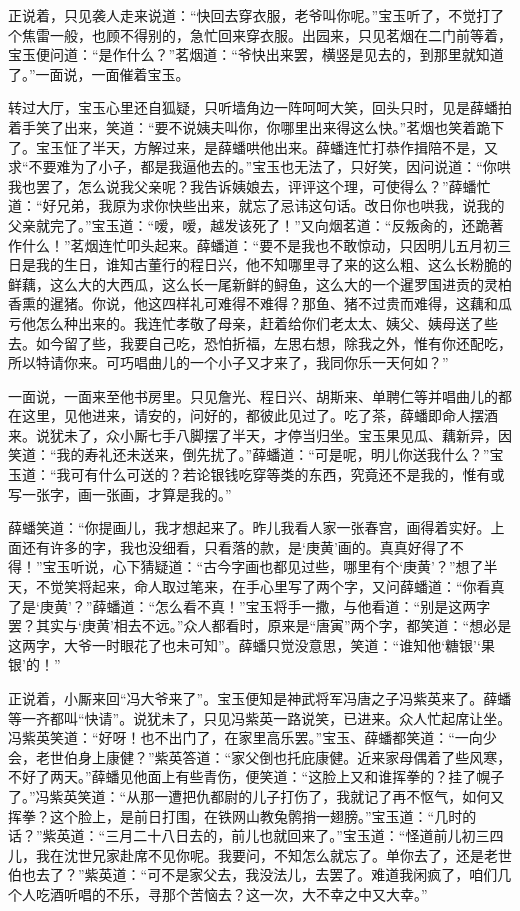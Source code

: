 \documentclass[12pt,oneside]{book}
\begin{document}
正说着，只见袭人走来说道：“快回去穿衣服，老爷叫你呢。”宝玉听了，不觉打了个焦雷一般，也顾不得别的，急忙回来穿衣服。出园来，只见茗烟在二门前等着，宝玉便问道：“是作什么？”茗烟道：“爷快出来罢，横竖是见去的，到那里就知道了。”一面说，一面催着宝玉。

转过大厅，宝玉心里还自狐疑，只听墙角边一阵呵呵大笑，回头只时，见是薛蟠拍着手笑了出来，笑道：“要不说姨夫叫你，你哪里出来得这么快。”茗烟也笑着跪下了。宝玉怔了半天，方解过来，是薛蟠哄他出来。薛蟠连忙打恭作揖陪不是，又求“不要难为了小子，都是我逼他去的。”宝玉也无法了，只好笑，因问说道：“你哄我也罢了，怎么说我父亲呢？我告诉姨娘去，评评这个理，可使得么？”薛蟠忙道：“好兄弟，我原为求你快些出来，就忘了忌讳这句话。改日你也哄我，说我的父亲就完了。”宝玉道：“嗳，嗳，越发该死了！”又向烟茗道：“反叛肏的，还跪著作什么！”茗烟连忙叩头起来。薛蟠道：“要不是我也不敢惊动，只因明儿五月初三日是我的生日，谁知古董行的程日兴，他不知哪里寻了来的这么粗、这么长粉脆的鲜藕，这么大的大西瓜，这么长一尾新鲜的鲟鱼，这么大的一个暹罗国进贡的灵柏香熏的暹猪。你说，他这四样礼可难得不难得？那鱼、猪不过贵而难得，这藕和瓜亏他怎么种出来的。我连忙孝敬了母亲，赶着给你们老太太、姨父、姨母送了些去。如今留了些，我要自己吃，恐怕折福，左思右想，除我之外，惟有你还配吃，所以特请你来。可巧唱曲儿的一个小子又才来了，我同你乐一天何如？”

一面说，一面来至他书房里。只见詹光、程日兴、胡斯来、单聘仁等并唱曲儿的都在这里，见他进来，请安的，问好的，都彼此见过了。吃了茶，薛蟠即命人摆酒来。说犹未了，众小厮七手八脚摆了半天，才停当归坐。宝玉果见瓜、藕新异，因笑道：“我的寿礼还未送来，倒先扰了。”薛蟠道：“可是呢，明儿你送我什么？”宝玉道：“我可有什么可送的？若论银钱吃穿等类的东西，究竟还不是我的，惟有或写一张字，画一张画，才算是我的。”

薛蟠笑道：“你提画儿，我才想起来了。昨儿我看人家一张春宫，画得着实好。上面还有许多的字，我也没细看，只看落的款，是‘庚黄’画的。真真好得了不得！”宝玉听说，心下猜疑道：“古今字画也都见过些，哪里有个‘庚黄’？”想了半天，不觉笑将起来，命人取过笔来，在手心里写了两个字，又问薛蟠道：“你看真了是‘庚黄’？”薛蟠道：“怎么看不真！”宝玉将手一撒，与他看道：“别是这两字罢？其实与‘庚黄’相去不远。”众人都看时，原来是“唐寅”两个字，都笑道：“想必是这两字，大爷一时眼花了也未可知”。薛蟠只觉没意思，笑道：“谁知他‘糖银’‘果银’的！”

正说着，小厮来回“冯大爷来了”。宝玉便知是神武将军冯唐之子冯紫英来了。薛蟠等一齐都叫“快请”。说犹未了，只见冯紫英一路说笑，已进来。众人忙起席让坐。冯紫英笑道：“好呀！也不出门了，在家里高乐罢。”宝玉、薛蟠都笑道：“一向少会，老世伯身上康健？”紫英答道：“家父倒也托庇康健。近来家母偶着了些风寒，不好了两天。”薛蟠见他面上有些青伤，便笑道：“这脸上又和谁挥拳的？挂了幌子了。”冯紫英笑道：“从那一遭把仇都尉的儿子打伤了，我就记了再不怄气，如何又挥拳？这个脸上，是前日打围，在铁网山教兔鹘捎一翅膀。”宝玉道：“几时的话？”紫英道：“三月二十八日去的，前儿也就回来了。”宝玉道：“怪道前儿初三四儿，我在沈世兄家赴席不见你呢。我要问，不知怎么就忘了。单你去了，还是老世伯也去了？”紫英道：“可不是家父去，我没法儿，去罢了。难道我闲疯了，咱们几个人吃酒听唱的不乐，寻那个苦恼去？这一次，大不幸之中又大幸。”
\end{document}
